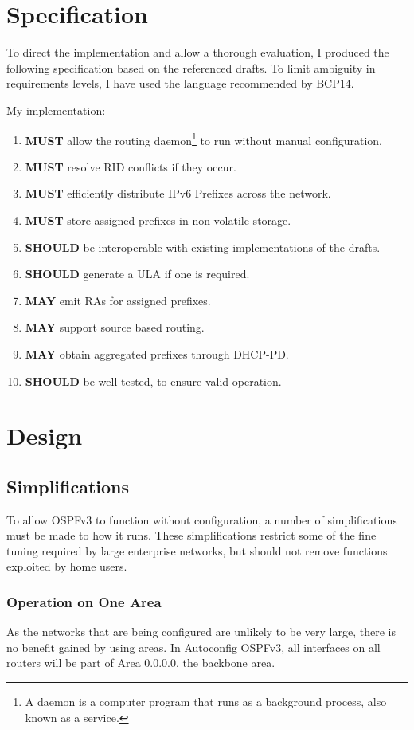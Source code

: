 \documentclass[12pt,a4paper,twoside]{report}
\begin{document}
\chapter{Specification}
To direct the implementation and allow a thorough evaluation, I produced the
following specification based on the referenced drafts. To limit
ambiguity in requirements levels, I have used the language recommended by BCP14.
\cite{rfc2119}

My implementation:
\begin{enumerate}
      \item \textbf{MUST} allow the routing daemon\footnote{A daemon is a computer
      program that runs as a background process, also known as a service.} to run
      without manual configuration.
      \item \textbf{MUST} resolve RID conflicts if they occur.
      \item \textbf{MUST} efficiently distribute IPv6 Prefixes across the network.
      \item \textbf{MUST} store assigned prefixes in non volatile storage.
      \item \textbf{SHOULD} be interoperable with existing implementations of the drafts.
      \item \textbf{SHOULD} generate a ULA if one is required.
      \item \textbf{MAY} emit RAs for assigned prefixes.
      \item \textbf{MAY} support source based routing.
      \item \textbf{MAY} obtain aggregated prefixes through DHCP-PD. 
      \item \textbf{SHOULD} be well tested, to ensure valid operation.
\end{enumerate}

\chapter{Design}
\section{Simplifications}
To allow OSPFv3 to function without configuration, a number of simplifications
must be made to how it runs. These simplifications restrict some of the fine
tuning required by large enterprise networks, but should not remove functions
exploited by home users. 

\subsection{Operation on One Area}
As the networks that are being configured are unlikely to be very large, there
is no benefit gained by using areas. In Autoconfig OSPFv3, all
interfaces on all routers will be part of Area 0.0.0.0, the backbone area.
\end{document}
